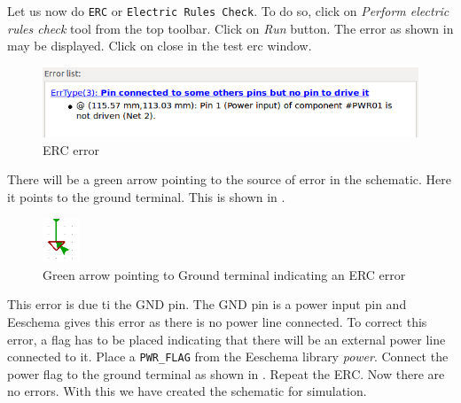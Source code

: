 Let us now do {\tt ERC} or {\tt Electric Rules Check}. To do so, click
on \textit{Perform electric rules check} tool from the top
toolbar. Click on \textit{Run} button. The error as shown in
 may be displayed. Click on close in the test
erc window. 

\begin{figure}[h]
\centering
\includegraphics[width=\lgfig]{manual_images/erc2.png}
\caption{ERC error}
\label{erc}
\end{figure}

There will be a green arrow pointing to the source of error in the
schematic. Here it points to the ground terminal. This is shown in
.

\begin{figure}[h]
\centering
\includegraphics[width=0.1\textwidth]{ercgnd.png}
\caption{Green arrow pointing to Ground terminal indicating an ERC error}
\label{ercgnd}
\end{figure}

This error is due ti the GND pin. The GND pin is a power input pin and Eeschema gives this error as there is no power line connected. To correct this error, a flag has to be placed indicating that there will be an external power line connected to it. Place a {\tt PWR\_FLAG} from the Eeschema 
library \textit{power}.  Connect the power flag to the
ground terminal as shown in . %
Repeat the ERC. Now there are no errors. With this we have created the schematic for simulation.

